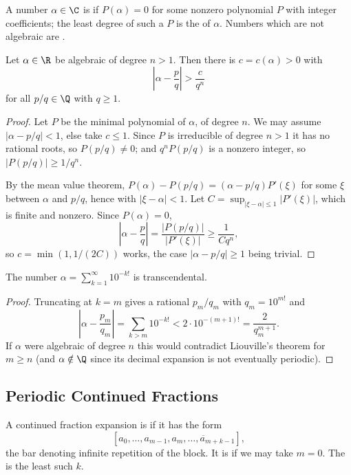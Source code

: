 \begin{definition}
	A number $\alpha \in \C$ is  if $P(\alpha) = 0$ for some nonzero polynomial $P$ with integer coefficients; the least degree of such a $P$ is the  of $\alpha$. Numbers which are not algebraic are .
\end{definition}

\begin{theorem}[Liouville]
	Let $\alpha \in \R$ be algebraic of degree $n > 1$. Then there is $c = c(\alpha) > 0$ with
	$$
	\left|\alpha - \frac pq\right| > \frac c{q^n}
	$$
	for all $p/q \in \Q$ with $q \geq 1$.
\end{theorem}
\begin{proof}
	Let $P$ be the minimal polynomial of $\alpha$, of degree $n$. We may assume $|\alpha - p/q| < 1$, else take $c \leq 1$. Since $P$ is irreducible of degree $n > 1$ it has no rational roots, so $P(p/q) \neq 0$; and $q^nP(p/q)$ is a nonzero integer, so $|P(p/q)| \geq 1/q^n$.

	By the mean value theorem, $P(\alpha) - P(p/q) = (\alpha - p/q)P'(\xi)$ for some $\xi$ between $\alpha$ and $p/q$, hence with $|\xi - \alpha| < 1$. Let $C = \sup_{|\xi - \alpha| \leq 1}|P'(\xi)| $, which is finite and nonzero. Since $P(\alpha) = 0$,
	$$
	\left|\alpha - \frac pq\right| = \frac{|P(p/q)|}{|P'(\xi)|} \geq \frac{1}{Cq^n},
	$$
	so $c = \min(1, 1/(2C))$ works, the case $|\alpha - p/q| \geq 1$ being trivial.
\end{proof}

\begin{corollary}
	The number $\alpha = \sum_{k=1}^\infty 10^{-k!}$ is transcendental.
\end{corollary}
\begin{proof}
	Truncating at $k = m$ gives a rational $p_m/q_m$ with $q_m = 10^{m!}$ and
	$$
	\left|\alpha - \frac{p_m}{q_m}\right| = \sum_{k > m}10^{-k!} < 2\cdot 10^{-(m+1)!} = \frac{2}{q_m^{m+1}}.
	$$
	If $\alpha$ were algebraic of degree $n$ this would contradict Liouville's theorem for $m \geq n$ (and $\alpha \notin \Q$ since its decimal expansion is not eventually periodic).
\end{proof}

\subsection{Periodic Continued Fractions}

\begin{definition}
	A continued fraction expansion is  if it has the form
	$$
	[a_0, \dots, a_{m-1}, \overline{a_m, \dots, a_{m+k-1}}],
	$$
	the bar denoting infinite repetition of the block. It is  if we may take $m = 0$. The  is the least such $k$.
\end{definition}

